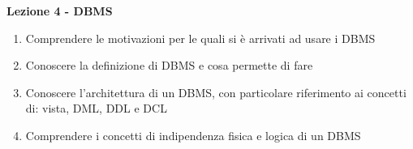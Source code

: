 \documentclass{article}
\begin{document}
	\begin{center}
	\textbf{Lezione 4 - DBMS}
	\begin{enumerate}
	\item Comprendere le motivazioni per le quali si è arrivati ad usare i DBMS
	\item Conoscere la definizione di DBMS e cosa permette di fare
	\item Conoscere l'architettura di un DBMS, con particolare riferimento ai concetti di: vista, DML, DDL e DCL
	\item Comprendere i concetti di indipendenza fisica e logica di un DBMS
	\end{enumerate}
	\end{center}
	
\end{document}
